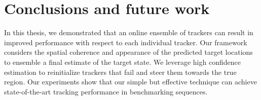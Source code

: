 \chapter{Conclusions and future work}
\label{chapter::conclusions}

In this thesis, we demonstrated that an online ensemble of trackers can result
in improved performance with respect to each individual tracker. Our framework
considers the spatial coherence and appearance of the predicted target locations
to ensemble a final estimate of the target state. We leverage high confidence
estimation to reinitialize trackers that fail and steer them towards the true
region. Our experiments show that our simple but effective technique can achieve
state-of-the-art tracking performance in benchmarking sequences.

